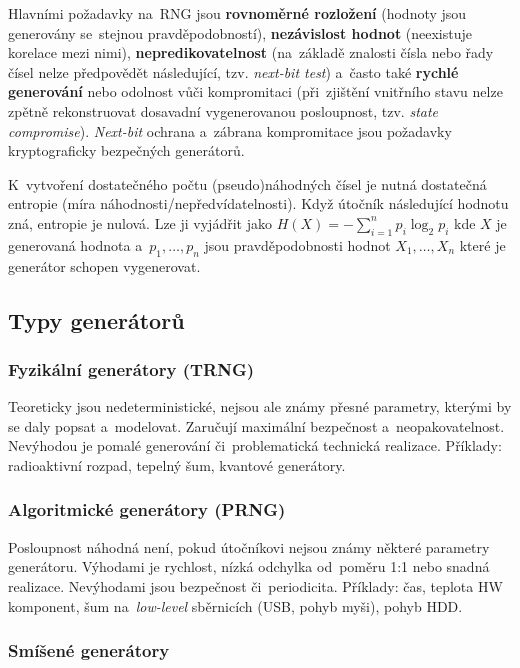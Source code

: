 Hlavními požadavky na~RNG jsou \textbf{rovnoměrné rozložení} (hodnoty jsou generovány se~stejnou pravděpodobností), \textbf{nezávislost hodnot} (neexistuje korelace mezi nimi), \textbf{nepredikovatelnost} (na~základě znalosti čísla nebo řady čísel nelze předpovědět následující, tzv. \emph{next-bit test}) a~často také \textbf{rychlé generování} nebo odolnost vůči kompromitaci (při~zjištění vnitřního stavu nelze zpětně rekonstruovat dosavadní vygenerovanou posloupnost, tzv. \emph{state compromise}). \emph{Next-bit} ochrana a~zábrana kompromitace jsou požadavky kryptograficky bezpečných generátorů.

K~vytvoření dostatečného počtu (pseudo)náhodných čísel je nutná dostatečná entropie (míra náhodnosti/nepředvídatelnosti). Když útočník následující hodnotu zná, entropie je nulová. Lze ji vyjádřit jako $H(X) = - \sum_{i=1}^{n} p_i \log_2 p_i$ kde $X$ je generovaná hodnota a~$p_1, \dots, p_n$ jsou pravděpodobnosti hodnot $X_1, \dots, X_n$ které je generátor schopen vygenerovat.

\subsection{Typy generátorů}

\subsubsection*{Fyzikální generátory (TRNG)}

Teoreticky jsou nedeterministické, nejsou ale známy přesné parametry, kterými by se daly popsat a~modelovat. Zaručují maximální bezpečnost a~neopakovatelnost. Nevýhodou je pomalé generování či~problematická technická realizace. Příklady: radioaktivní rozpad, tepelný šum, kvantové generátory.

\subsubsection*{Algoritmické generátory (PRNG)}

Posloupnost náhodná není, pokud útočníkovi nejsou známy některé parametry generátoru. Výhodami je rychlost, nízká odchylka od~poměru 1:1 nebo snadná realizace. Nevýhodami jsou bezpečnost či~periodicita. Příklady: čas, teplota HW komponent, šum na~\emph{low-level} sběrnicích (USB, pohyb myši), pohyb HDD.

\subsubsection*{Smíšené generátory}

